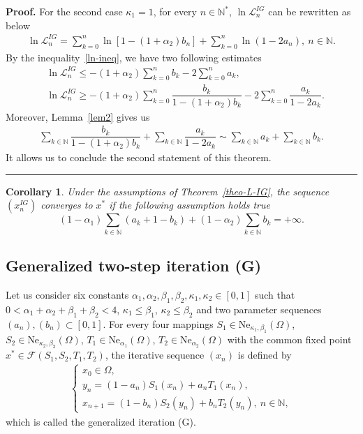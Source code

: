 \documentclass[a4paper, 11pt]{article}
\newtheorem{corollary}[theorem]{Corollary}
\newenvironment{proof}[1][Proof]{\textbf{#1.} }{\hfill\rule{0.5em}{0.5em}}
\begin{document}
\begin{proof}
			For the second case $\kappa_1=1$, for every $n \in \mathbb N^*$, $\ln \mathcal{L}_n^{IG}$ can be rewritten as below
			\begin{align*}
				\ln{\mathcal{L}_n^{IG}} = \sum_{k=0}^{n} \ln[1 - (1 + \alpha_2)b_n] + \sum_{k=0}^{n} \ln(1 - 2a_n), ~ n \in \mathbb{N}.
			\end{align*}
By the inequality~\eqref{ln-ineq}, we have two following estimates
			\begin{align*}
				&\ln{\mathcal{L}_n^{IG}} \le -(1+\alpha_2)\sum_{k=0}^{n}{b_k}-2\sum_{k=0}^{n}{a_k},\\
				&\ln{\mathcal{L}_n^{IG}} \ge -(1+\alpha_2)\sum_{k=0}^{n} \dfrac{b_k}{1-(1+\alpha_2)b_k} - 2\sum_{k=0}^{n} \dfrac{a_k}{1-2a_k}.
			\end{align*}
Moreover, Lemma~\ref{lem2} gives us
			\begin{align*} 
				\sum_{k \in \mathbb{N}} \dfrac{b_k}{1-(1+\alpha_2)b_k} + \sum_{k \in \mathbb{N}} \dfrac{a_k}{1-2a_k}  \sim \sum_{k \in \mathbb{N}}a_k+ \sum_{k \in \mathbb{N}}b_k.
			\end{align*}
It allows us to conclude the second statement of this theorem. 
		\end{proof}
		\begin{corollary}\label{cor-IG}
			Under the assumptions of Theorem~\ref{theo-L-IG}, the sequence $(x_n^{IG})$ converges to $x^*$ if the following assumption holds true
			$$\displaystyle (1-\alpha_1)\sum_{k \in \mathbb{N}}(a_k+1-b_k)+(1-\alpha_2)\sum_{k \in \mathbb{N}}b_k=+\infty.$$
		\end{corollary}

\subsection{Generalized two-step iteration (G)}

Let us consider six constants $\alpha_1,\alpha_2,\beta_1,\beta_2, \kappa_1, \kappa_2 \in [0,1]$ such that $0 < \alpha_1 + \alpha_2 + \beta_1 + \beta_2 < 4$, $\kappa_1 \le \beta_1$, $\kappa_2 \le \beta_2$ and two parameter sequences $(a_n),(b_n) \subset [0, 1]$. For every four mappings $S_1 \in \text{Ne}_{\kappa_1, \beta_1}(\Omega)$, $S_2 \in \text{Ne}_{\kappa_2, \beta_2}(\Omega)$, $T_1 \in \text{Ne}_{\alpha_1}(\Omega)$, $T_2 \in \text{Ne}_{\alpha_2}(\Omega)$ with the common fixed point $x^* \in \mathcal{F}(S_1, S_2, T_1, T_2)$, the iterative sequence $(x_n)$ is defined by
\begin{align}\tag{G}\label{xn-G}
\begin{cases}x_0 \in \Omega,\\ y_{n} = (1-a_n)S_1(x_n) + a_nT_1(x_n), \\ x_{n+1} = (1-b_n)S_2(y_n) + b_nT_2(y_n), \ n \in \mathbb{N},\end{cases}	
\end{align} 
which is called the generalized iteration (G).
\end{document}
